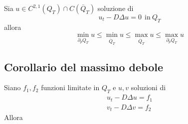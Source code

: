 \documentclass[10pt,a4paper,twoside,openright]{book}
\begin{document}
Sia $u\in C^{2,1}(Q_{T}) \cap C(\overline{Q}_{T})$ soluzione di
\begin{equation*}
u_{t} -D\Delta u=0\ \ \text{in} \ Q_{T}
\end{equation*}
allora
\begin{equation*}
\min_{\partial _{p} Q_{T}} u\leqslant \min_{\overline{Q}_{T}} u\leqslant \max_{\overline{Q}_{T}} u\leqslant \max_{\partial _{p} Q_{T}} u
\end{equation*}
\subsection{Corollario del massimo debole}

Siano $f_{1},f_{2}$ funzioni limitate in $Q_{T}$ e $u,v$ soluzioni di
\begin{gather*}
u_{t} -D\Delta u=f_{1}\\
v_{t} -D\Delta v=f_{2}
\end{gather*}
Allora
\end{document}
